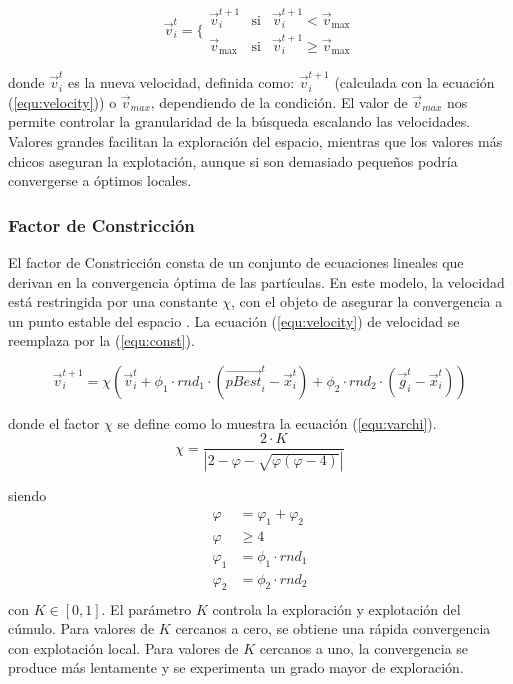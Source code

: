     \begin{equation}
	\vec{v}^t_i = \{
	\begin{matrix} 
	  \vec{v}^{t+1}_i & \mbox{si}& \vec{v}^{t+1}_i < \vec{v}_{\max}\\
	  \vec{v}_{\max} & \mbox{si}& \vec{v}^{t+1}_i \geq \vec{v}_{\max}
	\end{matrix}
    \label{equ:control}
    \end{equation}

    {\setlength{\parindent}{0pt}
  donde $\vec{v}^{t}_i$ es la nueva velocidad, definida como: $\vec{v}^{t+1}_i$ (calculada con la ecuaci\'on (\ref{equ:velocity})) o 
  $\vec{v}_{max}$, dependiendo de 
  la condici\'on. El valor de $\vec{v}_{max}$ nos permite controlar la granularidad de la b\'usqueda escalando las velocidades. Valores 
  grandes facilitan la exploraci\'on del espacio, mientras que los valores m\'as chicos aseguran la explotaci\'on, aunque si son demasiado 
  peque\~nos podr\'ia convergerse a \'optimos locales. 
  }
    \subsubsection{Factor de Constricci\'on}
  
  El factor de Constricci\'on consta de un conjunto de ecuaciones lineales que 
  derivan en la convergencia \'optima de las part\'iculas. En este modelo, la velocidad est\'a restringida por una
  constante $\chi$, con el objeto de asegurar la convergencia a un punto estable del espacio \cite{clerc99}. La ecuaci\'on (\ref{equ:velocity})
  de velocidad se reemplaza por la (\ref{equ:const}).

    \begin{equation}
	  \vec{v}^{t+1}_{i} = \chi \left( \vec{v}^t_i + \phi_1 \cdot rnd_1 \cdot \left(\vec{pBest}^t_i - \vec{x}^t_i \right) 
					    + \phi_2 \cdot rnd_2 \cdot \left(\vec{g}^t_i - \vec{x}^t_i \right) \right) 
      \label{equ:const}
   \end{equation}
  
  {\setlength{\parindent}{0pt}
  donde el factor $\chi$ se define como lo muestra la ecuaci\'on (\ref{equ:varchi}).
  }
  \begin{equation}
	  \chi = \frac{2 \cdot K}{|2- \varphi - \sqrt{\varphi \left(\varphi - 4\right)}|} 
      \label{equ:varchi}
   \end{equation}
  
 {\setlength{\parindent}{0pt}
siendo
}
\begin{align*}
  \varphi &= \varphi_1 + \varphi_2 \\
  \varphi &\geq 4 \\
  \varphi_1 &= \phi_1 \cdot rnd_1 \\
  \varphi_2 &= \phi_2 \cdot rnd_2 \\  
\end{align*}
{\setlength{\parindent}{0pt}
  con $K \in[0,1]$. El par\'ametro $K$ controla la exploraci\'on y explotaci\'on del c\'umulo. Para valores de $K$ cercanos a cero, se 
  obtiene una r\'apida convergencia con explotaci\'on local. Para valores de $K$ cercanos a uno, la convergencia se produce 
  m\'as lentamente y se experimenta un grado mayor de exploraci\'on. 
}
